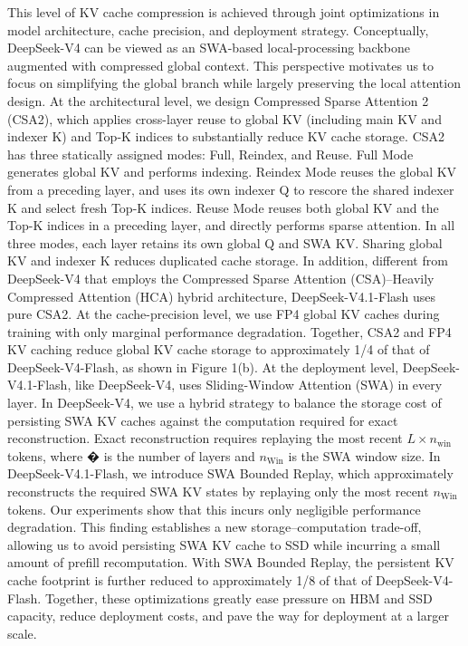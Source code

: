 \documentclass[
  10
]{article}
\begin{document}
This level of KV cache compression is achieved through joint
optimizations in model architecture, cache precision, and deployment
strategy. Conceptually, DeepSeek-V4 can be viewed as an SWA-based
local-processing backbone augmented with compressed global context. This
perspective motivates us to focus on simplifying the global branch while
largely preserving the local attention design. At the architectural
level, we design Compressed Sparse Attention 2 (CSA2), which applies
cross-layer reuse to global KV (including main KV and indexer K) and
Top-K indices to substantially reduce KV cache storage. CSA2 has three
statically assigned modes: Full, Reindex, and Reuse. Full Mode generates
global KV and performs indexing. Reindex Mode reuses the global KV from
a preceding layer, and uses its own indexer Q to rescore the shared
indexer K and select fresh Top-K indices. Reuse Mode reuses both global
KV and the Top-K indices in a preceding layer, and directly performs
sparse attention. In all three modes, each layer retains its own global
Q and SWA KV. Sharing global KV and indexer K reduces duplicated cache
storage. In addition, different from DeepSeek-V4 that employs the
Compressed Sparse Attention (CSA)--Heavily Compressed Attention (HCA)
hybrid architecture, DeepSeek-V4.1-Flash uses pure CSA2. At the
cache-precision level, we use FP4 global KV caches during training with
only marginal performance degradation. Together, CSA2 and FP4 KV caching
reduce global KV cache storage to approximately 1/4 of that of
DeepSeek-V4-Flash, as shown in Figure 1(b). At the deployment level,
DeepSeek-V4.1-Flash, like DeepSeek-V4, uses Sliding-Window Attention
(SWA) in every layer. In DeepSeek-V4, we use a hybrid strategy to
balance the storage cost of persisting SWA KV caches against the
computation required for exact reconstruction. Exact reconstruction
requires replaying the most recent
\(L \times n _ { \mathrm { w i n } }\) tokens, where � is the number of
layers and \(n _ { \mathrm { W i n } }\) is the SWA window size. In
DeepSeek-V4.1-Flash, we introduce SWA Bounded Replay, which
approximately reconstructs the required SWA KV states by replaying only
the most recent \(n _ { \mathrm { W i n } }\) tokens. Our experiments
show that this incurs only negligible performance degradation. This
finding establishes a new storage--computation trade-off, allowing us to
avoid persisting SWA KV cache to SSD while incurring a small amount of
prefill recomputation. With SWA Bounded Replay, the persistent KV cache
footprint is further reduced to approximately 1/8 of that of
DeepSeek-V4-Flash. Together, these optimizations greatly ease pressure
on HBM and SSD capacity, reduce deployment costs, and pave the way for
deployment at a larger scale.
\end{document}

